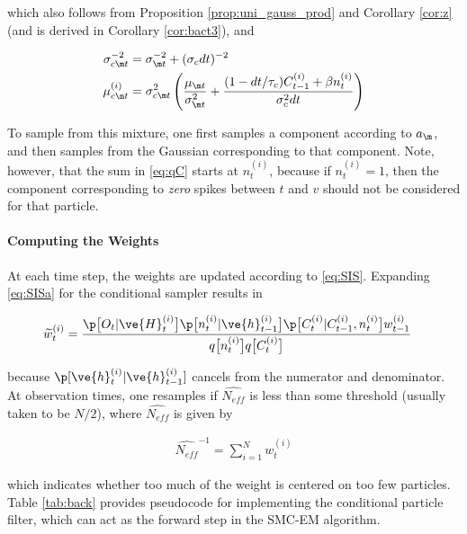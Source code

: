 \noindent which also follows from Proposition \ref{prop:uni_gauss_prod} and Corollary \ref{cor:z} (and is derived in Corollary \ref{cor:bact3}), and

\begin{align}
\sigma_{c\m t}^{-2} &= \sigma_{\m t}^{-2} + (\sigma_c dt)^{-2}\\
\mu_{c\m t}^{(i)} &=\sigma_{c\m t}^2 \left( \frac{\mu_{\m t}} {\sigma_{\m t}^2} + \frac{(1-dt/\tau_c) C_{t-1}^{(i)} + \beta n_t^{(i)}}{\sigma_c^2 dt}\right)
\end{align}

To sample from this mixture, one first samples a component according to $a_\m$, and then samples from the Gaussian corresponding to that component.  Note, however, that the sum in \eqref{eq:qC} starts at $n_t^{(i)}$, because if $n_t^{(i)}=1$, then the component corresponding to \emph{zero} spikes between $t$ and $v$ should not be considered for that particle.

\paragraph{Computing the Weights}

At each time step, the weights are updated according to \eqref{eq:SIS}.  Expanding \eqref{eq:SISa} for the conditional sampler results in

\begin{align} \label{aeq:cond_w}
\widetilde{w}_t^{(i)} &= \frac{\p\big[O_t | \ve{H}_t^{(i)}\big]
\p\big[n_t^{(i)} | \ve{h}_{t-1}^{(i)}\big] \p\big[C_t^{(i)} | C_{t-1}^{(i)}, n_t^{(i)}\big] w_{t-1}^{(i)}}{q\big[n_t^{(i)}\big] q\big[C_t^{(i)}\big]}
\end{align}

\noindent because $\p[\ve{h}_t^{(i)} | \ve{h}_{t-1}^{(i)}]$ cancels from the numerator and denominator.  At observation times, one resamples if $\widehat{N_{eff}}$ is less than some threshold (usually taken to be $N/2$), where $\widehat{N_{eff}}$ is given by

\begin{align}
\widehat{N_{eff}}^{-1} = \sum_{i=1}^N w_t^{(i)}
\end{align}

\noindent which indicates whether too much of the weight is centered on too few particles\cite{Rubin88}.  Table \ref{tab:back} provides pseudocode for implementing the conditional particle filter, which can act as the forward step in the SMC-EM algorithm.

